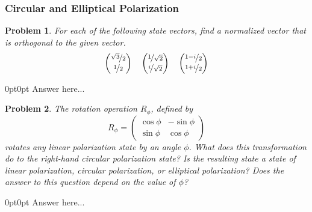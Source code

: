 \documentclass[12pt]{article}
\newenvironment{answer}
    {\begin{adjustwidth}{0pt}{0pt}}
    {\end{adjustwidth}}
\newtheorem{problem}{Problem}
\theoremstyle{remark}  %
\begin{document}
\subsubsection{Circular and Elliptical Polarization}
\setcounter{problem}{0}
    \begin{problem}
        For each of the following state vectors, find a normalized vector that is orthogonal to the given vector. $$\begin{pmatrix}
            \nicefrac{\sqrt{3}}{2} \\
            \nicefrac{1}{2}
        \end{pmatrix}\quad\begin{pmatrix}
            \nicefrac{1}{\sqrt{2}} \\
            \nicefrac{i}{\sqrt{2}}
        \end{pmatrix}\quad\begin{pmatrix}
            \nicefrac{1-i}{2} \\
            \nicefrac{1+i}{2}
        \end{pmatrix}$$
    \end{problem}
    \begin{answer}
        Answer here...
    \end{answer}
    \begin{problem}
        The rotation operation $R_\phi$, defined by $$R_\phi=\begin{pmatrix}
            \cos\phi & -\sin\phi \\
            \sin\phi & \cos\phi
        \end{pmatrix}$$ rotates any linear polarization state by an angle $\phi$. What does this transformation do to the right-hand circular polarization state? Is the resulting state a state of linear polarization, circular polarization, or elliptical polarization? Does the answer to this question depend on the value of $\phi$?
    \end{problem}
    \begin{answer}
        Answer here...
    \end{answer}
\end{document}
